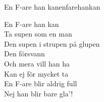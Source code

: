 \begin{song}{En F-are han kan}{enfarehankan}
\begin{vers}
En F-are han kan\\
Ta supen som en man\\
Den supen i strupen på glupen\\
Den försvann\\
Och mera vill han ha\\
Kan ej för mycket ta\\
En F-are blir aldrig full\\
Nej han blir bare gla'! \\
\end{vers}
\end{song}
